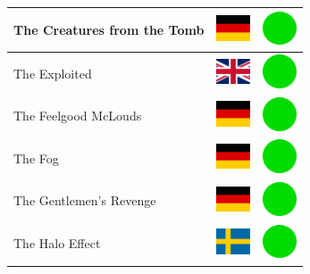 \documentclass[12pt, a4paper, twoside]{report}
\begin{document}
\begin{center}
\begin{longtable}{|p{5cm}|p{2cm}|p{2cm}|}
 The Creatures from the Tomb                                & \includegraphics[width=1cm]{../4x3/de} &   \includegraphics[width=1cm]{../likes/y} \\ \hline
 The Exploited                                              & \includegraphics[width=1cm]{../4x3/gb} &   \includegraphics[width=1cm]{../likes/y} \\ \hline
 The Feelgood McLouds                                       & \includegraphics[width=1cm]{../4x3/de} &   \includegraphics[width=1cm]{../likes/y} \\ \hline
 The Fog                                                    & \includegraphics[width=1cm]{../4x3/de} &   \includegraphics[width=1cm]{../likes/y} \\ \hline
 The Gentlemen's Revenge                                    & \includegraphics[width=1cm]{../4x3/de} &   \includegraphics[width=1cm]{../likes/y} \\ \hline
 The Halo Effect                                            & \includegraphics[width=1cm]{../4x3/se} &   \includegraphics[width=1cm]{../likes/y} \\ \hline

\end{longtable}
\end{center}
\end{document}
